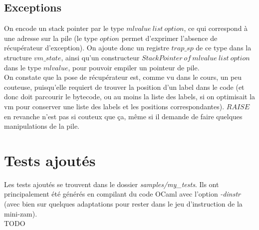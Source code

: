 \documentclass{article}
\begin{document}
\subsection{Exceptions}
On encode un stack pointer par le type $mlvalue\:list\:option$, ce qui correspond à une adresse sur la pile (le type $option$ permet d'exprimer l'absence de récupérateur d'exception). On ajoute donc un registre $trap\_sp$ de ce type dans la structure $vm\_state$, ainsi qu'un constructeur $StackPointer\:of\:mlvalue\:list\:option$ dans le type $mlvalue$, pour pouvoir empiler un pointeur de pile.\\
On constate que la pose de récupérateur est, comme vu dans le cours, un peu couteuse, puisqu'elle requiert de trouver la position d'un label dans le code (et donc doit parcourir le bytecode, ou au moins la liste des labels, si on optimisait la vm pour conserver une liste des labels et les positions correspondantes). $RAISE$ en revanche n'est pas si couteux que ça, même si il demande de faire quelques manipulations de la pile.

\section{Tests ajoutés}
Les tests ajoutés se trouvent dans le dossier \textit{samples/my\_tests}. Ils ont principalement été générés en compilant du code OCaml avec l'option \textit{-dinstr} (avec bien sur quelques adaptations pour rester dans le jeu d'instruction de la mini-zam).\\
TODO
\end{document}

